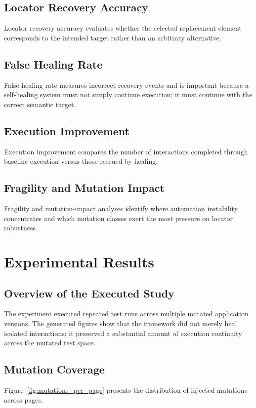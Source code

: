 \documentclass[conference]{IEEEtran}
\begin{document}
\subsection{Locator Recovery Accuracy}
Locator recovery accuracy evaluates whether the selected replacement element corresponds to the intended target rather than an arbitrary alternative.

\subsection{False Healing Rate}
False healing rate measures incorrect recovery events and is important because a self-healing system must not simply continue execution; it must continue with the correct semantic target.

\subsection{Execution Improvement}
Execution improvement compares the number of interactions completed through baseline execution versus those rescued by healing.

\subsection{Fragility and Mutation Impact}
Fragility and mutation-impact analyses identify where automation instability concentrates and which mutation classes exert the most pressure on locator robustness.

\section{Experimental Results}
\subsection{Overview of the Executed Study}
The experiment executed repeated test runs across multiple mutated application versions. The generated figures show that the framework did not merely heal isolated interactions; it preserved a substantial amount of execution continuity across the mutated test space.

\subsection{Mutation Coverage}
Figure~\ref{fig:mutations_per_page} presents the distribution of injected mutations across pages.
\end{document}
